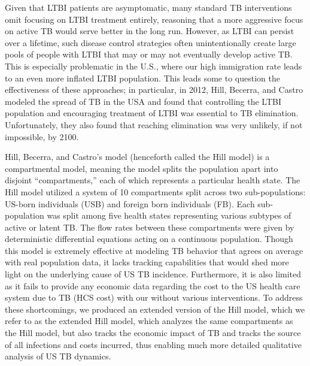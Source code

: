 \documentclass{amsart}
\renewcommand{\(}{\left(}
\renewcommand{\)}{\right)}
\begin{document}
Given that LTBI patients are asymptomatic, many standard TB interventions omit
focusing on LTBI treatment entirely, reasoning that a more aggressive focus on
active TB would serve better in the long run.  However, as LTBI can persist over
a lifetime, such disease control strategies often unintentionally create large
pools of people with LTBI that may or may not eventually develop active TB. This
is especially problematic in the U.S., where our high immigration rate leads to
an even more inflated LTBI population. This leads some to question the
effectiveness of these approaches; in particular, in 2012, Hill, Becerra, and
Castro modeled the spread of TB in the USA and found that controlling the LTBI
population and encouraging treatment of LTBI was essential to TB elimination.
Unfortunately, they also found that reaching elimination was very unlikely, if
not impossible, by 2100. 


Hill, Becerra, and Castro's model (henceforth called the Hill model) is a
compartmental model, meaning the model splits the population apart into disjoint
``compartments,'' each of which represents a particular health state. The Hill
model utilized a system of 10 compartments split across two sub-populations:
US-born individuals (USB) and foreign born individuals (FB).  Each
sub-population was split among five health states representing various subtypes
of active or latent TB. The flow rates between these compartments were given by
deterministic differential equations acting on a continuous population.
Though this model is extremely effective at modeling TB behavior that agrees on
average with real population data, it lacks tracking capabilities that
would shed more light on the underlying cause of US TB incidence.
Furthermore, it is also limited as it fails to provide any economic data
regarding the cost to the US health care system due to TB (HCS cost) with our
without various interventions. To address these shortcomings, we produced an
extended version of the Hill model, which we refer to as the extended Hill
model, which analyzes the same compartments as the Hill model, but also tracks
the economic impact of TB and tracks the source of all infections and costs
incurred, thus enabling much more detailed qualitative analysis of US TB
dynamics. 
\end{document}
